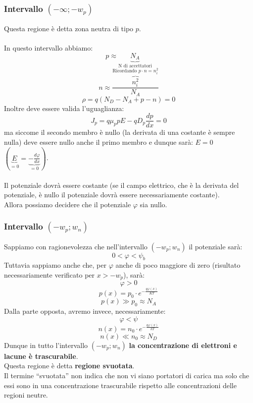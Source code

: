 \documentclass[../main.tex]{subfiles}
\begin{document}
	\subsubsection{Intervallo $(-\infty; -w_p)$}
	\label{subsub:int-pn1}
	Questa regione è detta zona neutra di tipo $p$.\\\\
	In questo intervallo abbiamo:
	$$p \approx \underbrace{N_A}_{\text{N di accettatori}}$$
	$$n \approx \frac{\overbrace{n_i^2}^{\text{Ricordando }p\cdot n = n_i^2}}{N_A}$$
	$$\rho = q(N_D - N_A + p - n) = 0$$
	Inoltre deve essere valida l’uguaglianza:
	$$J_p = q\mu_p p E - qD_p \frac{dp}{dx} = 0$$
	ma siccome il secondo membro è nullo (la derivata di una costante è sempre nulla) deve essere nullo anche il primo membro e dunque sarà: $E = 0$ $(\underbrace{E}_{=0} = \underbrace{- \frac{d \varphi}{dx}}_{=0})$.\\\\
	Il potenziale dovrà essere costante (se il campo elettrico, che è la derivata del potenziale, è nullo il potenziale dovrà essere necessariamente costante). \\
	Allora possiamo decidere che il potenziale $\varphi$ sia nullo.
	\subsubsection{Intervallo $(-w_p; w_n)$}
	\label{subsub:int-pn2}
	Sappiamo con ragionevolezza che nell’intervallo $(-w_p; w_n)$ il potenziale sarà:
	$$0 < \varphi < \psi_b$$
	Tuttavia sappiamo anche che, per $\varphi$ anche di poco maggiore di zero (risultato necessariamente verificato per $x > -w_p$), sarà:
	$$\varphi > 0$$
	$$p(x) = p_0 \cdot e^{-\frac{q\varphi(x)}{KT}}$$
	$$p(x) \gg p_0 \approx N_A$$
	Dalla parte opposta, avremo invece, necessariamente:
	$$\varphi < \psi$$
	$$n(x) = n_0 \cdot e^{-\frac{q\varphi(x)}{kT}}$$
	$$n(x) \ll n_0 \approx N_D$$
	Dunque in tutto l’intervallo $(-w_p; w_n)$ \textbf{la concentrazione di elettroni e lacune è trascurabile}. \\
	Questa regione è detta \textbf{regione svuotata}. \\
	Il termine “svuotata” non indica che non vi siano portatori di carica ma solo che essi sono in una concentrazione trascurabile rispetto alle concentrazioni delle regioni neutre.
\end{document}
